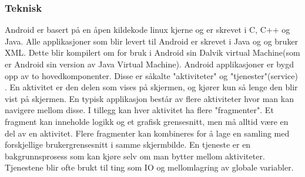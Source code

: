 \documentclass[../main.tex]{subfiles}
\begin{document}
\subsubsection{Teknisk}

Android er basert på en åpen kildekode linux kjerne og er skrevet i C, C++ og Java. Alle applikasjoner som blir levert til Android er skrevet i Java og og bruker XML. Dette blir kompilert om for bruk i Android sin Dalvik virtual Machine(som er Android sin version av Java Virtual Machine).\newline
\newline
Android applikasjoner er bygd opp av to hovedkomponenter. Disse er såkalte "aktiviteter"  og "tjenester"(service) . En aktivitet er den delen som vises på skjermen, og kjører kun så lenge den blir vist på skjermen. En typisk applikasjon består av flere aktiviteter hvor man kan navigere mellom disse. 
I tillegg kan hver aktivitet ha flere "fragmenter". Et fragment kan inneholde logikk og et grafisk grensesnitt, men må alltid være en del av en aktivitet. Flere fragmenter kan kombineres for å lage en samling med forskjellige brukergrensesnitt i samme skjermbilde.  \newline
En tjeneste er en bakgrunnsprosess som kan kjøre selv om man bytter mellom aktiviteter. Tjenestene blir ofte brukt til ting som IO og mellomlagring av globale variabler.

\newpage
\end{document}

